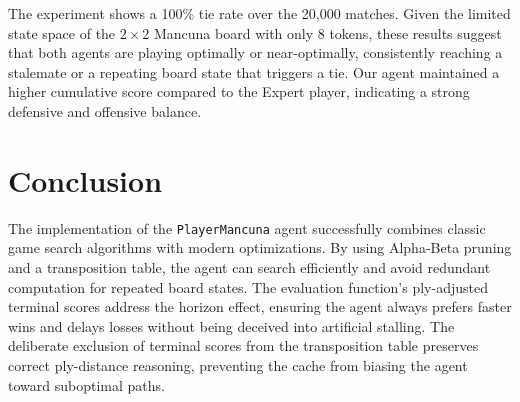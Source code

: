 \documentclass[12pt,a4paper]{article}
\begin{document}
The experiment shows a 100\% tie rate over the 20,000 matches. Given the limited state space of the $2 \times 2$ Mancuna board with only 8 tokens, these results suggest that both agents are playing optimally or near-optimally, consistently reaching a stalemate or a repeating board state that triggers a tie. Our agent maintained a higher cumulative score compared to the Expert player, indicating a strong defensive and offensive balance.

\section{Conclusion}
The implementation of the \texttt{PlayerMancuna} agent successfully combines classic game search algorithms with modern optimizations. By using Alpha-Beta pruning and a transposition table, the agent can search efficiently and avoid redundant computation for repeated board states. The evaluation function's ply-adjusted terminal scores address the horizon effect, ensuring the agent always prefers faster wins and delays losses without being deceived into artificial stalling. The deliberate exclusion of terminal scores from the transposition table preserves correct ply-distance reasoning, preventing the cache from biasing the agent toward suboptimal paths.
\end{document}
